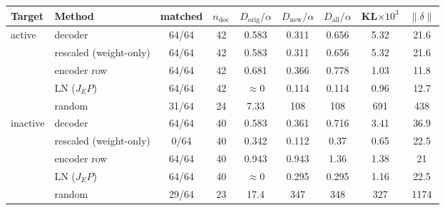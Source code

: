 \begin{tabular}{llccccccc}
\toprule
Target & Method & matched & $n_{\mathrm{doc}}$ & $D_{\mathrm{orig}}/\alpha$ & $D_{\mathrm{new}}/\alpha$ & $D_{\mathrm{all}}/\alpha$ & KL$\times10^{3}$ & $\|\delta\|$ \\
\midrule
active & decoder & 64/64 & 42 & 0.583 & 0.311 & 0.656 & 5.32 & 21.6 \\
 & rescaled (weight-only) & 64/64 & 42 & 0.583 & 0.311 & 0.656 & 5.32 & 21.6 \\
 & encoder row & 64/64 & 42 & 0.681 & 0.366 & 0.778 & 1.03 & 11.8 \\
 & LN ($J_EP$) & 64/64 & 42 & $\approx 0$ & 0.114 & 0.114 & 0.96 & 12.7 \\
 & random & 31/64 & 24 & 7.33 & 108 & 108 & 691 & 438 \\
\midrule
inactive & decoder & 64/64 & 40 & 0.583 & 0.361 & 0.716 & 3.41 & 36.9 \\
 & rescaled (weight-only) & 0/64 & 40 & 0.342 & 0.112 & 0.37 & 0.65 & 22.5 \\
 & encoder row & 64/64 & 40 & 0.943 & 0.943 & 1.36 & 1.38 & 21 \\
 & LN ($J_EP$) & 64/64 & 40 & $\approx 0$ & 0.295 & 0.295 & 1.16 & 22.5 \\
 & random & 29/64 & 23 & 17.4 & 347 & 348 & 327 & 1174 \\
\bottomrule
\end{tabular}
